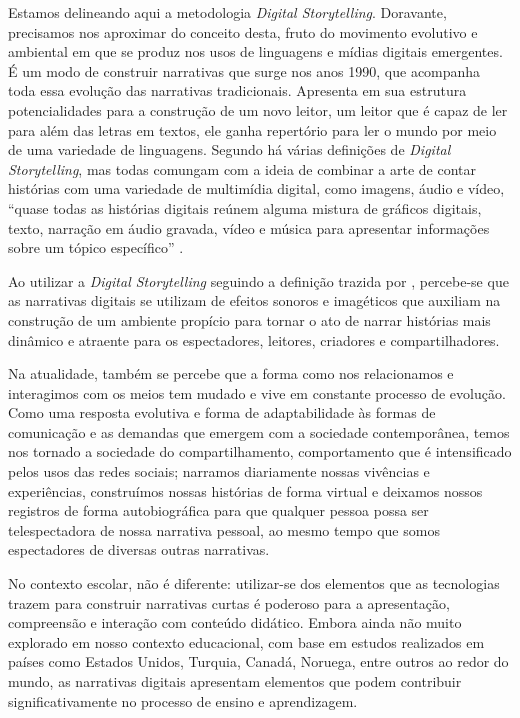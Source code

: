 \documentclass[portuguese]{textolivre}
\begin{document}
Estamos delineando aqui a metodologia \textit{Digital Storytelling}. Doravante, precisamos nos aproximar do conceito desta, fruto do movimento evolutivo e ambiental em que se produz nos usos de linguagens e mídias digitais emergentes. É um modo de construir narrativas que surge nos anos 1990, que acompanha toda essa evolução das narrativas tradicionais. Apresenta em sua estrutura potencialidades para a construção de um novo leitor, um leitor que é capaz de ler para além das letras em textos, ele ganha repertório para ler o mundo por meio de uma variedade de linguagens. Segundo \textcite{robin2006usos} há várias definições de \textit{Digital Storytelling}, mas todas comungam com a ideia de combinar a arte de contar histórias com uma variedade de multimídia digital, como imagens, áudio e vídeo, “quase todas as histórias digitais reúnem alguma mistura de gráficos digitais, texto, narração em áudio gravada, vídeo e música para apresentar informações sobre um tópico específico” \cite[p.~1, tradução nossa]{robin2006usos}.

Ao utilizar a \textit{Digital Storytelling} seguindo a definição trazida por \textcite{robin2006usos}, percebe-se que as narrativas digitais se utilizam de efeitos sonoros e imagéticos que auxiliam na construção de um ambiente propício para tornar o ato de narrar histórias mais dinâmico e atraente para os espectadores, leitores, criadores e compartilhadores.

Na atualidade, também se percebe que a forma como nos relacionamos e interagimos com os meios tem mudado e vive em constante processo de evolução. Como uma resposta evolutiva e forma de adaptabilidade às formas de comunicação e as demandas que emergem com a sociedade contemporânea, temos nos tornado a sociedade do compartilhamento, comportamento que é intensificado pelos usos das redes sociais; narramos diariamente nossas vivências e experiências, construímos nossas histórias de forma virtual e deixamos nossos registros de forma autobiográfica para que qualquer pessoa possa ser telespectadora de nossa narrativa pessoal, ao mesmo tempo que somos espectadores de diversas outras narrativas.

No contexto escolar, não é diferente: utilizar-se dos elementos que as tecnologias trazem para construir narrativas curtas é poderoso para a apresentação, compreensão e interação com conteúdo didático. Embora ainda não muito explorado em nosso contexto educacional, com base em estudos realizados em países como Estados Unidos, Turquia, Canadá, Noruega, entre outros ao redor do mundo, as narrativas digitais apresentam elementos que podem contribuir significativamente no processo de ensino e aprendizagem.
\end{document}

